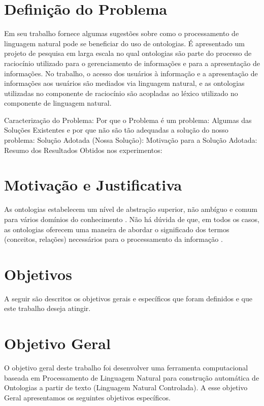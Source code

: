 \documentclass{bcc}
\begin{document}
\section{Definição do Problema}

Em seu trabalho \cite{estival2004} fornece algumas sugestões sobre como o processamento de linguagem natural pode se beneficiar do uso de ontologias. É apresentado um projeto de pesquisa em larga escala no qual ontologias são parte do processo de raciocínio utilizado para o gerenciamento de informações e para a apresentação de informações. No trabalho, o acesso dos usuários à informação e a apresentação de informações aos usuários são mediados via linguagem natural, e as ontologias utilizadas no componente de raciocínio são acopladas ao léxico utilizado no componente de linguagem natural.

Caracterização do Problema:
Por que o Problema é um problema:
Algumas das Soluções Existentes e por que não são tão adequadas a solução do nosso problema:
Solução Adotada (Nossa Solução):
Motivação para a Solução Adotada:
Resumo dos Resultados Obtidos nos experimentos:

\section{Motivação e Justificativa}

As ontologias estabelecem um nível de abstração superior, não ambíguo e comum para vários domínios do conhecimento \cite{rocha2014}. Não há dúvida de que, em todos os casos, as ontologias oferecem uma maneira de abordar o significado dos termos (conceitos, relações) necessários para o processamento da informação \cite{estival2004}.


\section{Objetivos}

A seguir são descritos os objetivos gerais e específicos que foram definidos e que este trabalho deseja atingir.

\section{Objetivo Geral}
O objetivo geral deste trabalho foi desenvolver uma ferramenta computacional baseada em Processamento de Linguagem Natural para construção automática de Ontologias a partir de texto (Linguagem Natural Controlada). A esse objetivo Geral apresentamos os seguintes objetivos específicos.
\end{document}
